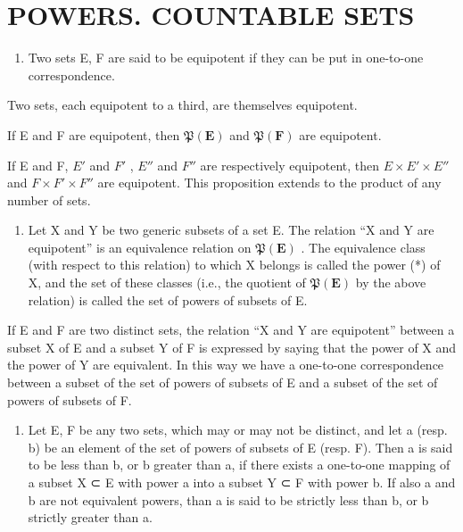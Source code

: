 \section{POWERS. COUNTABLE SETS}

\begin{enumerate}
\def\labelenumi{\arabic{enumi}.}
\tightlist
\item
  Two sets E, F are said to be equipotent if they can be put in one-to-one correspondence.
\end{enumerate}

Two sets, each equipotent to a third, are themselves equipotent.

If E and F are equipotent, then \(\mathfrak{P}(\mathbf{E})\) and \(\mathfrak{P}(\mathbf{F})\) are equipotent.

If E and F, \(E'\) and \(F'\) , \(E''\) and \(F''\) are respectively equipotent, then \(E \times E' \times E''\) and \(F \times F' \times F''\) are equipotent. This proposition extends to the product of any number of sets.

\begin{enumerate}
\def\labelenumi{\arabic{enumi}.}
\setcounter{enumi}{1}
\tightlist
\item
  Let X and Y be two generic subsets of a set E. The relation ``X and Y are equipotent'' is an equivalence relation on \(\mathfrak{P}(\mathbf{E})\) . The equivalence class (with respect to this relation) to which X belongs is called the power (*) of X, and the set of these classes (i.e., the quotient of \(\mathfrak{P}(\mathbf{E})\) by the above relation) is called the set of powers of subsets of E.
\end{enumerate}

If E and F are two distinct sets, the relation ``X and Y are equipotent'' between a subset X of E and a subset Y of F is expressed by saying that the power of X and the power of Y are equivalent. In this way we have a one-to-one correspondence between a subset of the set of powers of subsets of E and a subset of the set of powers of subsets of F.

\begin{enumerate}
\def\labelenumi{\arabic{enumi}.}
\setcounter{enumi}{2}
\tightlist
\item
  Let E, F be any two sets, which may or may not be distinct, and let a (resp. b) be an element of the set of powers of subsets of E (resp. F). Then a is said to be less than b, or b greater than a, if there exists a one-to-one mapping of a subset X ⊂ E with power a into a subset Y ⊂ F with power b. If also a and b are not equivalent powers, than a is said to be strictly less than b, or b strictly greater than a.
\end{enumerate}

